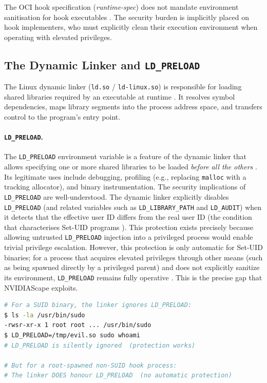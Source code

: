 \begin{infobox_env}
The OCI hook specification (\textit{runtime-spec}) does not mandate environment sanitisation for hook executables \cite{oci_runtime_spec}. The security burden is implicitly placed on hook implementers, who must explicitly clean their execution environment when operating with elevated privileges.
\end{infobox_env}

\subsection{The Dynamic Linker and \texttt{LD\_PRELOAD}}
\label{subsec:ldpreload}

The Linux dynamic linker (\texttt{ld.so} / \texttt{ld-linux.so}) is responsible for loading shared libraries required by an executable at runtime \cite{linux_ldso_manpage}. It resolves symbol dependencies, maps library segments into the process address space, and transfers control to the program's entry point.
\paragraph{\texttt{LD\_PRELOAD}.} The \texttt{LD\_PRELOAD} environment variable is a feature of the dynamic linker that allows specifying one or more shared libraries to be loaded \textit{before all the others}  \cite{linux_ldso_manpage}. Its legitimate uses include debugging, profiling (e.g., replacing \texttt{malloc} with a tracking allocator), and binary instrumentation.
The security implications of \texttt{LD\_PRELOAD} are well-understood. The dynamic linker explicitly disables \texttt{LD\_PRELOAD} (and related variables such as \texttt{LD\_LIBRARY\_PATH} and \texttt{LD\_AUDIT}) when it detects that the effective user ID differs from the real user ID (the condition that characterises Set-UID programs \cite{linux_ldso_manpage}). This protection exists precisely because allowing untrusted \texttt{LD\_PRELOAD} injection into a privileged process would enable trivial privilege escalation.
However, this protection is only automatic for Set-UID binaries; for a process that acquires elevated privileges through other means (such as being spawned directly by a privileged parent) and does not explicitly sanitize its environment, \texttt{LD\_PRELOAD} remains fully operative \cite{linux_execve_manpage}. This is the precise gap that NVIDIAScape exploits.

\begin{lstlisting}[language=bash, caption={The dynamic linker's LD\_PRELOAD security bypass for SUID binaries — not applicable when privilege is inherited from parent process.}]
# For a SUID binary, the linker ignores LD_PRELOAD:
$ ls -la /usr/bin/sudo
-rwsr-xr-x 1 root root ... /usr/bin/sudo
$ LD_PRELOAD=/tmp/evil.so sudo whoami
# LD_PRELOAD is silently ignored  (protection works)
 
# But for a root-spawned non-SUID hook process:
# The linker DOES honour LD_PRELOAD  (no automatic protection)
\end{lstlisting}

